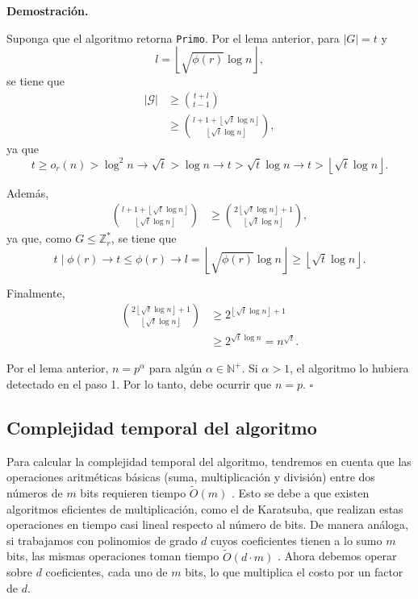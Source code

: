 \documentclass{article}
\newenvironment{dem}{\par\noindent\textbf{Demostración.}\par}{\hfill$\square$\par}
\begin{document}
\begin{dem}
Suponga que el algoritmo retorna \texttt{Primo}. Por el lema anterior, para $|G|=t$ y 
\[
l=\left\lfloor \sqrt{\phi(r)}\log n \right\rfloor,
\]
se tiene que
\begin{align}
|\mathcal{G}| 
&\geq \binom{t+l}{t-1} \\
&\geq \binom{l+1+\left\lfloor \sqrt{t}\log n \right\rfloor}
{\left\lfloor \sqrt{t}\log n \right\rfloor},
\label{eq:1}
\end{align}
ya que
\[
t\geq o_r(n)>\log^2 n
\to \sqrt{t}>\log n
\to t>\sqrt{t}\log n
\to t>\left\lfloor \sqrt{t}\log n \right\rfloor.
\]

Además,
\begin{align}
\binom{l+1+\left\lfloor \sqrt{t}\log n \right\rfloor}
{\left\lfloor \sqrt{t}\log n \right\rfloor}
&\geq
\binom{2\left\lfloor \sqrt{t}\log n \right\rfloor+1}
{\left\lfloor \sqrt{t}\log n \right\rfloor},
\label{eq:2}
\end{align}
ya que, como $G\leq \mathbb{Z}_r^*$, se tiene que
\[
t\mid \phi(r)
\to t\leq \phi(r)
\to
l=
\left\lfloor \sqrt{\phi(r)}\log n \right\rfloor
\geq
\left\lfloor \sqrt{t}\log n \right\rfloor.
\]

Finalmente,
\begin{align}
\binom{2\left\lfloor \sqrt{t}\log n \right\rfloor+1}
{\left\lfloor \sqrt{t}\log n \right\rfloor}
&\geq
2^{\left\lfloor \sqrt{t}\log n \right\rfloor+1}
\\
&\geq
2^{\sqrt{t}\log n}
=
n^{\sqrt{t}}.
\end{align}

Por el lema anterior, $n=p^\alpha$ para algún $\alpha\in\mathbb{N}^+$. 
Si $\alpha>1$, el algoritmo lo hubiera detectado en el paso 1. 
Por lo tanto, debe ocurrir que $n=p$.
\end{dem}
\subsection{Complejidad temporal del algoritmo}
Para calcular la complejidad temporal del algoritmo, tendremos en cuenta que
las operaciones aritméticas básicas (suma, multiplicación y división) entre dos números
de $m$ bits requieren tiempo $\tilde{O}(m)$ \cite{vzGG99}. Esto se debe a que existen algoritmos
eficientes de multiplicación, como el de Karatsuba, que
realizan estas operaciones en tiempo casi lineal respecto al número de bits. De manera
análoga, si trabajamos con polinomios de grado $d$ cuyos coeficientes tienen a lo sumo
$m$ bits, las mismas operaciones toman tiempo $\tilde{O}(d \cdot m)$ \cite{vzGG99}. Ahora debemos
operar sobre $d$ coeficientes, cada uno de $m$ bits, lo que multiplica el costo
por un factor de $d$. \\
\end{document}
